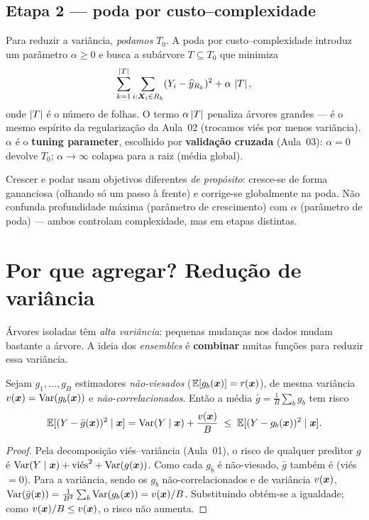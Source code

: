 \documentclass[11pt,a4paper]{article}
\begin{document}
\subsection{Etapa 2 --- poda por custo--complexidade}
Para reduzir a variância, \emph{podamos} $T_0$. A poda por custo--complexidade
introduz um parâmetro $\alpha\ge 0$ e busca a subárvore $T\subseteq T_0$ que
minimiza
\begin{equation}\label{eq:poda}
  \sum_{k=1}^{\left\lvert T \right\rvert}\sum_{i:\bm{X}_i\in R_k}(Y_i-\widehat y_{R_k})^2
   + \alpha\,\left\lvert T \right\rvert,
\end{equation}
onde $\left\lvert T \right\rvert$ é o número de folhas. O termo $\alpha\left\lvert T \right\rvert$ penaliza árvores
grandes --- é o mesmo espírito da regularização da Aula~02 (trocamos viés por menos
variância). $\alpha$ é o \textbf{tuning parameter}, escolhido por
\textbf{validação cruzada} (Aula~03): $\alpha=0$ devolve $T_0$;
$\alpha\to\infty$ colapsa para a raiz (média global).

\begin{atencao}
Crescer e podar usam objetivos diferentes \emph{de propósito}: cresce-se de forma
gananciosa (olhando só um passo à frente) e corrige-se globalmente na poda. Não
confunda profundidade máxima (parâmetro de crescimento) com $\alpha$ (parâmetro de
poda) --- ambos controlam complexidade, mas em etapas distintas.
\end{atencao}

\section{Por que agregar? Redução de variância}
Árvores isoladas têm \emph{alta variância}: pequenas mudanças nos dados mudam
bastante a árvore. A ideia dos \emph{ensembles} é \textbf{combinar} muitas funções
para reduzir essa variância.

\begin{proposicao}\label{prop:media}
Sejam $g_1,\dots,g_B$ estimadores \emph{não-viesados}
($\mathbb{E}[g_b(\bm{x})]=r(\bm{x})$), de mesma variância $v(\bm{x})=\operatorname{Var}(g_b(\bm{x}))$ e
\emph{não-correlacionados}. Então a média $\bar g=\frac1B\sum_b g_b$ tem risco
\[
  \mathbb{E}[(Y-\bar g(\bm{x}))^2\mid\bm{x}] = \operatorname{Var}(Y\mid\bm{x}) + \frac{v(\bm{x})}{B}
  \;\le\; \mathbb{E}[(Y-g_b(\bm{x}))^2\mid\bm{x}].
\]
\end{proposicao}
\begin{proof}
Pela decomposição viés--variância (Aula~01), o risco de qualquer preditor $g$ é
$\operatorname{Var}(Y\mid\bm{x})+\text{viés}^2+\operatorname{Var}(g(\bm{x}))$. Como cada $g_b$ é não-viesado, $\bar
g$ também é (viés $=0$). Para a variância, sendo os $g_b$ não-correlacionados e de
variância $v(\bm{x})$,
$\operatorname{Var}(\bar g(\bm{x}))=\frac1{B^2}\sum_b \operatorname{Var}(g_b(\bm{x}))=v(\bm{x})/B$. Substituindo obtém-se a
igualdade; como $v(\bm{x})/B\le v(\bm{x})$, o risco não aumenta.
\end{proof}
\end{document}
